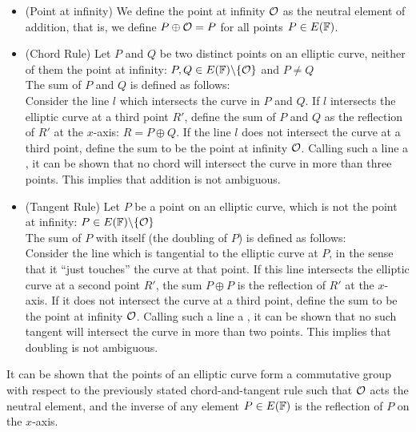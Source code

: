 \begin{definition}\label{def:chord-and-tangent}


\begin{itemize}
\item (Point at infinity) We define the point at infinity $\mathcal{O}$ as the neutral element of addition, that is, we define $P\oplus\mathcal{O} = P$ for all points $P\in E(\mathbb{F})$.
\item (Chord Rule) Let $P$ and $Q$ be two distinct points on an elliptic curve, neither of them the point at infinity: $P, Q\in E(\mathbb{F})\backslash \{\mathcal{O}\}$ and $P\neq Q$\\
The sum of $P$ and $Q$ is defined as follows:\\
Consider the line $l$ which intersects the curve in $P$ and $Q$. If $l$ intersects the elliptic curve at a third point $R'$, define the sum of $P$ and $Q$ as the reflection of $R'$ at the $x$-axis: $R=P\oplus Q$. If the line $l$ does not intersect the curve at a third point, define the sum to be the point at infinity $\mathcal{O}$. Calling such a line a , it can be shown that no chord will intersect the curve in more than three points. This implies that addition is not ambiguous.
\item (Tangent Rule) Let $P$ be a point on an elliptic curve, which is not the point at infinity: $P \in E(\mathbb{F})\backslash \{\mathcal{O}\}$\\
 The sum of $P$ with itself (the doubling of $P$) is defined as follows:\\
Consider the line which is tangential to the elliptic curve at $P$, in the sense that it ``just touches'' the curve at that point. If this line intersects the elliptic curve at a second point $R'$, the sum $P\oplus P$ is the reflection of $R'$ at the $x$-axis. If it does not intersect the curve at a third point, define the sum to be the point at infinity $\mathcal{O}$. Calling such a line a , it can be shown that no such tangent will intersect the curve in more than two points. This implies that doubling is not ambiguous.
\end{itemize}
\end{definition}

It can be shown that the points of an elliptic curve form a commutative group with respect to the previously stated chord-and-tangent rule such that $\mathcal{O}$ acts the neutral element, and the inverse of any element $P\in E(\mathbb{F})$ is the reflection of $P$ on the $x$-axis. 

